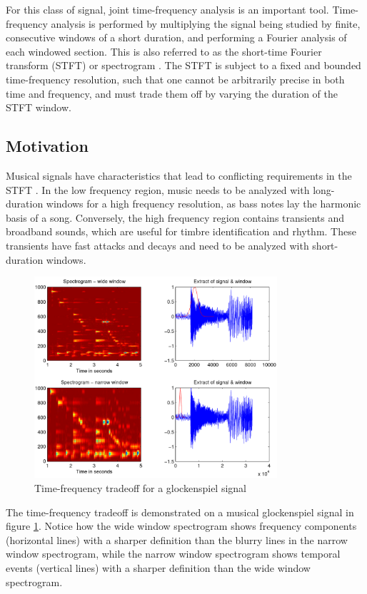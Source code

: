 \documentclass[letter,12pt,notitlepage]{article}
\begin{document}
For this class of signal, joint time-frequency analysis is an important tool. Time-frequency analysis is performed by multiplying the signal being studied by finite, consecutive windows of a short duration, and performing a Fourier analysis of each windowed section. This is also referred to as the short-time Fourier transform (STFT) or spectrogram . The STFT is subject to a fixed and bounded time-frequency resolution, such that one cannot be arbitrarily precise in both time and frequency, and must trade them off by varying the duration of the STFT window.

\subsection{Motivation}

Musical signals have characteristics that lead to conflicting requirements in the STFT \cite{doerflerphd}. In the low frequency region, music needs to be analyzed with long-duration windows for a high frequency resolution, as bass notes lay the harmonic basis of a song. Conversely, the high frequency region contains transients and broadband sounds, which are useful for timbre identification and rhythm. These transients have fast attacks and decays and need to be analyzed with short-duration windows. 

\begin{figure}[ht]
	\centering
	\includegraphics[width=9cm]{./tf_tradeoff_dorfler.png}
	\caption{Time-frequency tradeoff for a glockenspiel signal}
	\label{fig:dorflertradeoff}
\end{figure}

The time-frequency tradeoff is demonstrated on a musical glockenspiel signal in figure \ref{fig:dorflertradeoff}. Notice how the wide window spectrogram shows frequency components (horizontal lines) with a sharper definition than the blurry lines in the narrow window spectrogram, while the narrow window spectrogram shows temporal events (vertical lines) with a sharper definition than the wide window spectrogram.
\end{document}
